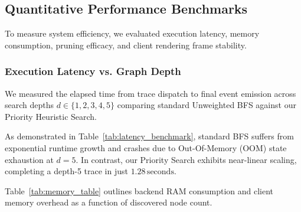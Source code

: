 \subsection{Quantitative Performance Benchmarks}

To measure system efficiency, we evaluated execution latency, memory consumption, pruning efficacy, and client rendering frame stability.

\subsubsection{Execution Latency vs. Graph Depth}
We measured the elapsed time from trace dispatch to final event emission across search depths $d \in \{1, 2, 3, 4, 5\}$ comparing standard Unweighted BFS against our Priority Heuristic Search.

\begin{table}[h]
\centering
\caption{End-to-End Search Latency across Search Depths ($W_0 = 50,000\,\text{USDT}$).}
\label{tab:latency_benchmark}
\end{table}

As demonstrated in Table~\ref{tab:latency_benchmark}, standard BFS suffers from exponential runtime growth and crashes due to Out-Of-Memory (OOM) state exhaustion at $d=5$. In contrast, our Priority Search exhibits near-linear scaling, completing a depth-5 trace in just $1.28\,\text{seconds}$.

Table~\ref{tab:memory_table} outlines backend RAM consumption and client memory overhead as a function of discovered node count.

